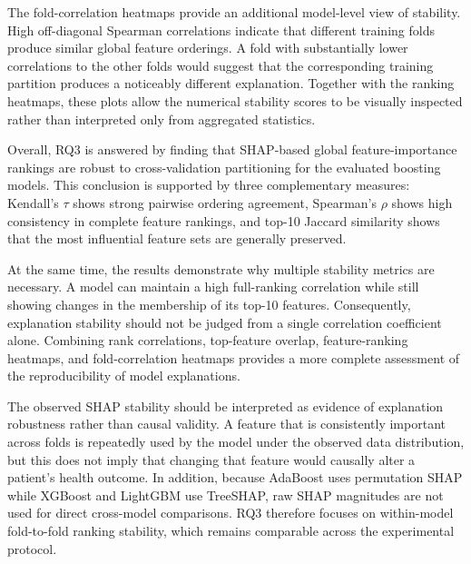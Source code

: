 The fold-correlation heatmaps provide an additional model-level view of
stability. High off-diagonal Spearman correlations indicate that different
training folds produce similar global feature orderings. A fold with
substantially lower correlations to the other folds would suggest that the
corresponding training partition produces a noticeably different explanation.
Together with the ranking heatmaps, these plots allow the numerical stability
scores to be visually inspected rather than interpreted only from aggregated
statistics.

Overall, RQ3 is answered by finding that SHAP-based global feature-importance
rankings are robust to cross-validation partitioning for the evaluated boosting
models. This conclusion is supported by three complementary measures:
Kendall's $\tau$ shows strong pairwise ordering agreement, Spearman's $\rho$
shows high consistency in complete feature rankings, and top-10 Jaccard
similarity shows that the most influential feature sets are generally
preserved.

At the same time, the results demonstrate why multiple stability metrics are
necessary. A model can maintain a high full-ranking correlation while still
showing changes in the membership of its top-10 features. Consequently,
explanation stability should not be judged from a single correlation
coefficient alone. Combining rank correlations, top-feature overlap,
feature-ranking heatmaps, and fold-correlation heatmaps provides a more
complete assessment of the reproducibility of model explanations.

The observed SHAP stability should be interpreted as evidence of explanation
robustness rather than causal validity. A feature that is consistently
important across folds is repeatedly used by the model under the observed data
distribution, but this does not imply that changing that feature would
causally alter a patient's health outcome. In addition, because AdaBoost uses
permutation SHAP while XGBoost and LightGBM use TreeSHAP, raw SHAP magnitudes
are not used for direct cross-model comparisons. RQ3 therefore focuses on
within-model fold-to-fold ranking stability, which remains comparable across
the experimental protocol.

